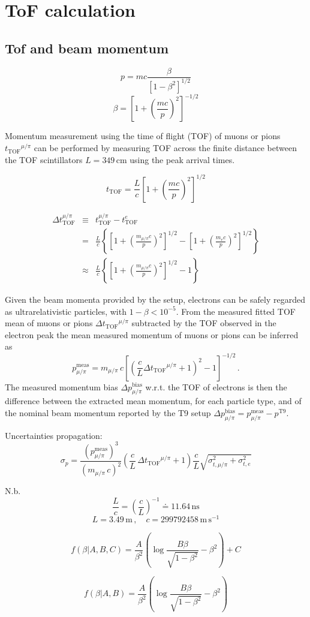\documentclass{article}
\newcommand{\ttof}{\ensuremath{t_\mathrm{TOF}}}
\begin{document}
\section{ToF calculation}

\subsection{Tof and beam momentum}


$$ p = mc \frac{\beta}{\left[  1 - \beta^2 \right]^{1/2}}$$
$$ \beta = \left[  1 + \left( \frac{mc}{p} \right)^2 \right]^{-1/2}$$


Momentum measurement using the time of flight (TOF) of muons or pions $\ttof^{\mu/\pi}$ can be performed by measuring TOF across the finite distance between the TOF scintillators $L=349\,\mathrm{cm}$ using the peak arrival times.

$$ t_\mathrm{TOF} = \frac{L}{c} \left[ 1 + \left( \frac{mc}{p}  \right)^2   \right]^{1/2}$$

\begin{eqnarray}
  \Delta t_\mathrm{TOF}^{\mu/\pi} &\equiv&  t^{\mu/\pi}_\mathrm{TOF} - t^e_\mathrm{TOF} \\
    &=& \frac{L}{c}  \left\{  \left[ 1 + \left( \frac{m_{\mu/\pi} c}{p}  \right)^2   \right]^{1/2} -  \left[ 1 + \left( \frac{m_e c}{p}  \right)^2   \right]^{1/2}   \right\} \\
     &\approx& \frac{L}{c}  \left\{  \left[ 1 + \left( \frac{m_{\mu/\pi} c}{p}  \right)^2   \right]^{1/2} - 1  \right\} 
\end{eqnarray}

    Given the beam momenta provided by the setup, electrons can be safely regarded as ultrarelativistic particles, with $1-\beta < 10^{-5}$.
From the measured fitted TOF mean of muons or pions $\Delta\ttof^{\mu/\pi}$ subtracted by the TOF observed in the electron peak the mean measured momentum of muons or pions 
can be inferred as 
$$p_{\mu/\pi}^\mathrm{meas} = m_{\mu/\pi} \, c \left[ \left( \frac{c}{L} \Delta\ttof^{\mu/\pi} + 1 \right)^2  - 1\right]^{-1/2}\,.$$
The measured momentum bias $\Delta p^\mathrm{bias}_{\mu/\pi}$ w.r.t. the TOF of electrons is then the difference between the extracted mean momentum, for each particle type, and of the nominal beam momentum reported by the T9 setup
$\Delta p^\mathrm{bias}_{\mu/\pi} =  p_{\mu/\pi}^\mathrm{meas} -  p^\mathrm{T9}$. 

Uncertainties propagation:
$$ \sigma_p = \frac{ \left( p_{\mu/\pi}^\mathrm{meas} \right)^3}{ \left(  m_{\mu/\pi} \, c \right)^2} \left( \frac{c}{L} \,\Delta\ttof^{\mu/\pi} + 1  \right)  \frac{c}{L} \sqrt{\sigma^2_{t,\mu/\pi} + \sigma^2_{t,e}}$$

N.b.
$$ \frac{L}{c} = \left( \frac{c}{L} \right)^{-1} \doteq 11.64\,\mathrm{ns}$$
$$ L = 3.49\, \mathrm{m}\,, \quad c = 299792458\, \mathrm{m}\,\mathrm{s}^{-1}$$

\clearpage


$$ f(\beta|A,B,C) = \frac{A}{\beta^2} \left( \log \frac{B\beta}{\sqrt{1-\beta^2}} - \beta^2 \right) + C $$

$$ f(\beta|A,B) = \frac{A}{\beta^2} \left( \log \frac{B\beta}{\sqrt{1-\beta^2}} - \beta^2 \right)$$
\end{document}
